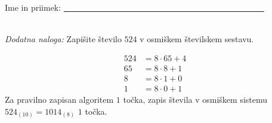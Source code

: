 \documentclass[addpoints]{exam}
\begin{document}
\begin{questions}
\begin{parts}
    
    

        \end{parts}








     \newpage

     \noindent Ime in priimek: \underline{~~~~~~~~~~~~~~~~~~~~~~~~~~~~~~~~~~~~~~~~~~~~~~~~}

     ~\\

    \bonusquestion[2]
    \textit{Dodatna naloga:} Zapišite število $524$ v osmiškem številskem sestavu.

    \begin{solution}[7cm]
        \begin{align*}
            524 &= 8\cdot 65 + 4 \\
            65 &= 8\cdot 8 + 1 \\
            8 &= 8\cdot 1 + 0 \\
            1 &= 8\cdot 0 + 1
        \end{align*}
        Za pravilno zapisan algoritem $1$ točka, zapis števila v osmiškem sistemu $524_{(10)}=1014_{(8)}$ $1$ točka.
    \end{solution}





\end{questions}
\end{document}
